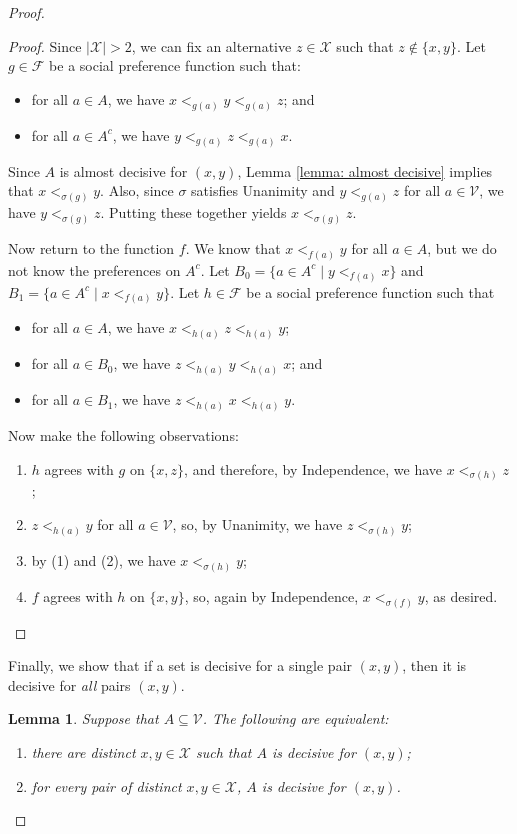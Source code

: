 \documentclass[a4paper]{memoir}
\newtheorem{lemma}[theorem]{Lemma}
\theoremstyle{definition}
\newcommand{\mc}{\mathcal}
\begin{document}
\begin{proof}
\begin{proof}
     Since $|\mc{X}| > 2$, we can fix an alternative $z \in \mc{X}$ such that $z \notin \{x,y\}$. 
     Let $g \in \mc{F}$ be a social preference function such that:
     \begin{itemize}
       \item for all $a \in A$, we have $x <_{g(a)} y <_{g(a)} z$; and
       \item for all $a \in A^c$, we have $y <_{g(a)} z <_{g(a)} x$.
     \end{itemize}
     Since $A$ is almost decisive for $(x,y)$, Lemma \ref{lemma: almost decisive} implies that 
     $x <_{\sigma(g)} y$. Also, since $\sigma$ satisfies Unanimity and $y <_{g(a)} z$ for all 
     $a \in \mc{V}$, we have $y <_{\sigma(g)} z$. Putting these together yields 
     $x <_{\sigma(g)} z$.
     
     Now return to the function $f$. We know that $x <_{f(a)} y$ for all $a \in A$, but we do not 
     know the preferences on $A^c$. Let $B_0 = \{a \in A^c \mid y <_{f(a)} x\}$ and 
     $B_1 = \{a \in A^c \mid x <_{f(a)} y\}$. Let $h \in \mc{F}$ be a social preference function 
     such that
     \begin{itemize}
       \item for all $a \in A$, we have $x <_{h(a)} z <_{h(a)} y$;
       \item for all $a \in B_0$, we have $z <_{h(a)} y <_{h(a)} x$; and
       \item for all $a \in B_1$, we have $z <_{h(a)} x <_{h(a)} y$.
     \end{itemize}
     Now make the following observations:
     \begin{enumerate}
       \item $h$ agrees with $g$ on $\{x,z\}$, and therefore, by Independence, we have 
       $x <_{\sigma(h)} z$;
       \item $z <_{h(a)} y$ for all $a \in \mc{V}$, so, by Unanimity, we have $z <_{\sigma(h)} y$;
       \item by (1) and (2), we have $x <_{\sigma(h)} y$;
       \item $f$ agrees with $h$ on $\{x,y\}$, so, again by Independence, 
       $x <_{\sigma(f)} y$, as desired.
     \end{enumerate}
  \end{proof}    
  
  Finally, we show that if a set is decisive for a single pair $(x,y)$, then it is decisive 
  for \emph{all} pairs $(x,y)$.
  
  \begin{lemma}
    Suppose that $A \subseteq \mc{V}$. The following are equivalent:
    \begin{enumerate}
      \item there are distinct $x,y \in \mc{X}$ such that $A$ is decisive for $(x,y)$;
      \item for \emph{every} pair of distinct $x,y \in \mc{X}$, $A$ is decisive for $(x,y)$.
    \end{enumerate}
  \end{lemma}
  

\end{proof}
\end{document}
